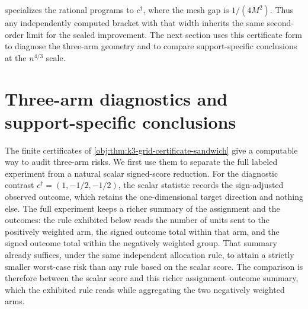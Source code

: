 \documentclass[11pt]{article}
\begin{document}
 specializes the rational programs to \(c^\dagger\), where the mesh gap is \(1/(4M^2)\). Thus any independently computed bracket with that width inherits the same second-order limit for the scaled improvement. The next section uses this certificate form to diagnose the three-arm geometry and to compare support-specific conclusions at the \(n^{4/3}\) scale.


\section{Three-arm diagnostics and support-specific conclusions}\label{sec:threearm}

The finite certificates of \cref{obj:thm:k3-grid-certificate-sandwich} give a computable way to audit three-arm risks. We first use them to separate the full labeled experiment from a natural scalar signed-score reduction. For the diagnostic contrast \(c^\dagger=(1,-1/2,-1/2)\), the scalar statistic records the sign-adjusted observed outcome, which retains the one-dimensional target direction and nothing else. The full experiment keeps a richer summary of the assignment and the outcomes: the rule exhibited below reads the number of units sent to the positively weighted arm, the signed outcome total within that arm, and the signed outcome total within the negatively weighted group. That summary already suffices, under the same independent allocation rule, to attain a strictly smaller worst-case risk than any rule based on the scalar score. The comparison is therefore between the scalar score and this richer assignment--outcome summary, which the exhibited rule reads while aggregating the two negatively weighted arms.
\end{document}

